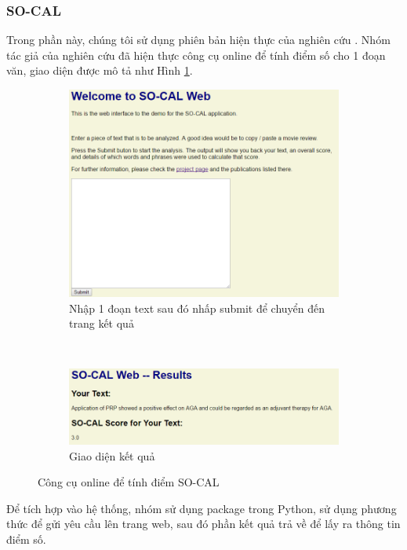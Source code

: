 \subsubsection*{SO-CAL}
Trong phần này, chúng tôi sử dụng phiên bản hiện thực của nghiên cứu \cite{taboada2011lexicon}. Nhóm tác giả của nghiên cứu \cite{taboada2011lexicon} đã hiện thực công cụ online để tính điểm số cho 1 đoạn văn, giao diện được mô tả như Hình \ref{fig:socal}.
\begin{figure}[H]
\centering
\begin{subfigure}[b]{0.4\textwidth}
\includegraphics[scale=0.3]{../hinh/socal.png}
\caption{Nhập 1 đoạn text sau đó nhấp submit để chuyển đến trang kết quả}
\end{subfigure}
~
\begin{subfigure}[b]{0.4\textwidth}
\includegraphics[scale=0.3]{../hinh/socal_result.png}
 \caption{Giao diện kết quả}
\end{subfigure}
\caption{Công cụ online để tính điểm SO-CAL} \label{fig:socal}
\end{figure}

Để tích hợp vào hệ thống, nhóm sử dụng package  trong Python, sử dụng phương thức  để gửi yêu cầu lên trang web, sau đó  phần kết quả trả về để lấy ra thông tin điểm số.
